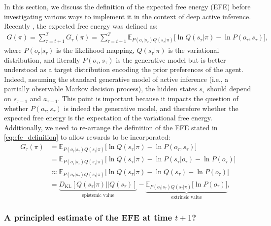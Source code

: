 \documentclass[twoside,11pt]{article}
\newcommand{\kl}[2]{D_{\mathrm{KL}} \left[ \left. \left. #1 \right|\right| #2 \right] }
\begin{document}
In this section, we discuss the definition of the expected free energy (EFE) before investigating various ways to implement it in the context of deep active inference. Recently \citep{Parr304782}, the expected free energy was defined as:
\begin{align}
G(\pi) = \sum_{\tau = t+1}^T G_\tau(\pi) = \sum_{\tau = t+1}^T \mathbb{E}_{P(o_\tau|s_\tau)Q(s_\tau | \pi)}\big[\ln Q(s_\tau | \pi) - \ln P(o_\tau, s_\tau)\big],\label{eq:efe_definition}
\end{align}
where $P(o_\tau|s_\tau)$ is the likelihood mapping, $Q(s_\tau | \pi)$ is the variational distribution, and literally $P(o_\tau, s_\tau)$ is the generative model but is better understood as a target distribution encoding the prior preferences of the agent. Indeed, assuming the standard generative model of active inference (i.e., a partially observable Markov decision process), the hidden states $s_\tau$ should depend on $s_{\tau-1}$ and $a_{\tau-1}$. This point is important because it impacts the question of whether $P(o_\tau, s_\tau)$ is indeed the generative model, and therefore whether the expected free energy is the expectation of the variational free energy. Additionally, we need to re-arrange the definition of the EFE stated in \eqref{eq:efe_definition} to allow rewards to be incorporated:
\begin{align}
G_\tau(\pi) &= \mathbb{E}_{P(o_\tau|s_\tau)Q(s_\tau | \pi)}\big[\ln Q(s_\tau | \pi) - \ln P(o_\tau, s_\tau)\big]\nonumber\\
&= \mathbb{E}_{P(o_\tau|s_\tau)Q(s_\tau | \pi)}\big[\ln Q(s_\tau | \pi) - \ln P(s_\tau|o_\tau)- \ln P(o_\tau)\big]\nonumber\\
&\approx \mathbb{E}_{P(o_\tau|s_\tau)Q(s_\tau | \pi)}\big[\ln Q(s_\tau | \pi) - \ln Q(s_\tau)- \ln P(o_\tau)\big]\nonumber\\
&= \underbrace{\kl{Q(s_\tau | \pi)}{Q(s_\tau)}}_{\text{epistemic value}} - \underbrace{\mathbb{E}_{P(o_\tau|s_\tau)Q(s_\tau | \pi)}\big[\ln P(o_\tau)\big]}_{\text{extrinsic value}},\label{eq:efe_practice}
\end{align}

\subsubsection{A principled estimate of the EFE at time $t + 1$?}
\end{document}

